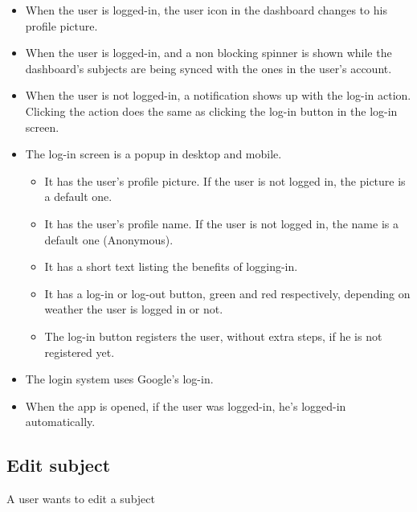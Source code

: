 \begin{itemize}[leftmargin=2cm]
    \item[\nextTask{}\label{req:x}] When the user is logged-in, the user icon in the dashboard changes to his profile picture.
    \item[\nextTask{}\label{req:x}] When the user is logged-in, and a non blocking spinner is shown while the dashboard's subjects are being synced with the ones in the user's account.
    \item[\nextTask{}\label{req:x}] When the user is not logged-in, a notification shows up with the log-in action. Clicking the action does the same as clicking the log-in button in the log-in screen.
    \item[\nextTask{}\label{req:x}] The log-in screen is a popup in desktop and mobile.
    \begin{itemize}[leftmargin=2cm]
        \item[\nextTask{}\label{req:x}] It has the user's profile picture. If the user is not logged in, the picture is a default one. 
        \item[\nextTask{}\label{req:x}] It has the user's profile name. If the user is not logged in, the name is a default one (Anonymous). 
        \item[\nextTask{}\label{req:x}] It has a short text listing the benefits of logging-in.
        \item[\nextTask{}\label{req:x}] It has a log-in or log-out button, green and red respectively, depending on weather the user is logged in or not.
        \item[\nextTask{}\label{req:x}] The log-in button registers the user, without extra steps, if he is not registered yet.
    \end{itemize}
    \item[\nextTask{}\label{req:x}] The login system uses Google's log-in.
    \item[\nextTask{}\label{req:x}] When the app is opened, if the user was logged-in, he's logged-in automatically.
\end{itemize}

\subsection*{Edit subject}
A user wants to edit a subject

